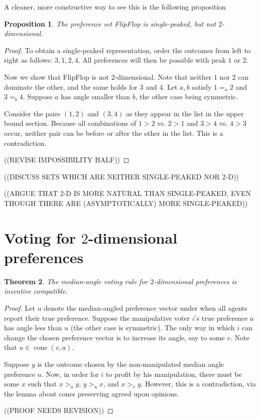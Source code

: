 \documentclass[12pt]{article}
\newtheorem{theorem}{Theorem}
\newtheorem{proposition}[theorem]{Proposition}
\DeclareMathOperator*{\cone}{cone}
\newcommand{\1}[1]{\mathds{1}[{#1}]}
\begin{document}
  A cleaner, more constructive way to see this is the following proposition
  \begin{proposition}
    The preference set {\sc FlipFlop} is single-peaked, but not
    $2$-dimensional.
  \end{proposition}
  \begin{proof}
    To obtain a single-peaked representation, order the outcomes
    from left to right as follows: $3,1,2,4$.
    All preferences will then be possible with peak $1$ or $2$.

    Now we show that {\sc FlipFlop} is not $2$-dimensional.
    Note that neither $1$ nor $2$ can dominate the other,
    and the same holds for $3$ and $4$.
    Let $a,b$ satisfy $1=_a2$ and $3=_b4$.
    Suppose $a$ has angle smaller than $b$, the other case being symmetric.

    Consider the pairs $(1,2)$ and $(3,4)$ as they appear in the list in the
    upper bound section. Because all combinations of $1>2$ vs. $2>1$ and
    $3>4$ vs. $4>3$ occur, neither pair can be before or after the other in the
    list. This is a contradiction.

    ((REVISE IMPOSSIBILITY HALF))
  \end{proof}

  ((DISCUSS SETS WHICH ARE NEITHER SINGLE-PEAKED NOR 2-D))

  ((ARGUE THAT 2-D IS MORE NATURAL THAN SINGLE-PEAKED,
  EVEN THOUGH THERE ARE (ASYMPTOTICALLY) MORE SINGLE-PEAKED))
\section{Voting for $2$-dimensional preferences}

  \begin{theorem}
    The median-angle voting rule for $2$-dimensional preferences
    is incentive compatible.
  \end{theorem}
  \begin{proof}
    Let $u$ denote the median-angled preference vector under when all
    agents report their true preference.
    Suppose the manipulative voter $i$'s true preference $a$
    has angle less than $u$ (the other case is symmetric).
    The only way in which $i$ can change the chosen preference vector
    is to increase its angle, say to some $v$.
    Note that $u \in \cone(v,a)$.

    Suppose $y$ is the outcome chosen by the non-manipulated median
    angle preference $u$.
    Now, in order for $i$ to profit by his manipulation,
    there must be some $x$ such that
    $x >_a y$, $y >_u x$, and $x >_v y$.
    However, this is a contradiction, via the lemma about cones
    preserving agreed upon opinions.

    ((PROOF NEEDS REVISION))
  \end{proof}
\end{document}
